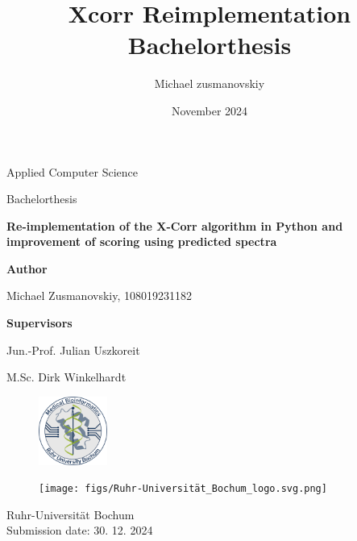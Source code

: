 \documentclass[11pt]{article}
\title{Xcorr Reimplementation Bachelorthesis}
\author{Michael zusmanovskiy}
\date{November 2024}
\begin{document}
\begin{titlepage}
    \begin{center}
        \LARGE
        Applied Computer Science

        \vspace{1cm}
        
        \LARGE
        Bachelorthesis

        \vspace{1cm}
            
        \LARGE
        \textbf{Re-implementation of the X-Corr algorithm in Python and improvement of scoring using predicted spectra}
            
        \vspace{1cm}

        \LARGE
        \textbf{Author}
        
        Michael Zusmanovskiy, 108019231182
        
        \vspace{1cm}
        
        \LARGE
        \textbf{Supervisors}
        
        Jun.-Prof. Julian Uszkoreit
        
        M.Sc. Dirk Winkelhardt
            
        \vfill
                \begin{figure}[ht]
            \centering
            \includegraphics[width=0.2\textwidth]{figs/medbioinf_logo-small.png}
        \end{figure}
        \begin{figure}[ht]
            \centering
            \texttt{[image: figs/Ruhr-Universität\_Bochum\_logo.svg.png]}
        \end{figure}
            
        \Large
        Ruhr-Universität Bochum\\
        
        Submission date: 30. 12. 2024
            
    \end{center}
\end{titlepage}

\tableofcontents
\newpage
\end{document}
